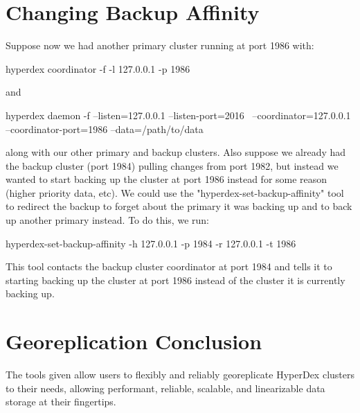 \section{Changing Backup Affinity}
\label{sec:affinity}

Suppose now we had another primary cluster running at port 1986 with:

\begin{consolecode}
hyperdex coordinator -f -l 127.0.0.1 -p 1986
\end{consolecode}

and

\begin{consolecode}
hyperdex daemon -f --listen=127.0.0.1 --listen-port=2016 \
                   --coordinator=127.0.0.1 --coordinator-port=1986 --data=/path/to/data
\end{consolecode}

along with our other primary and backup clusters. Also suppose we already
had the backup cluster (port 1984) pulling changes from port 1982, but instead
we wanted to start backing up the cluster at port 1986 instead for some reason
(higher priority data, etc). We could use the "hyperdex-set-backup-affinity"
tool to redirect the backup to forget about the primary it was backing up
and to back up another primary instead. To do this, we run:

\begin{consolecode}
  hyperdex-set-backup-affinity -h 127.0.0.1 -p 1984 -r 127.0.0.1 -t 1986
\end{consolecode}

This tool contacts the backup cluster coordinator at port 1984 and tells it
to starting backing up the cluster at port 1986 instead of the cluster
it is currently backing up.

\section{Georeplication Conclusion}
\label{sec:geoconc}

The tools given allow users to flexibly and reliably georeplicate HyperDex clusters
to their needs, allowing performant, reliable, scalable, and linearizable data
storage at their fingertips.
